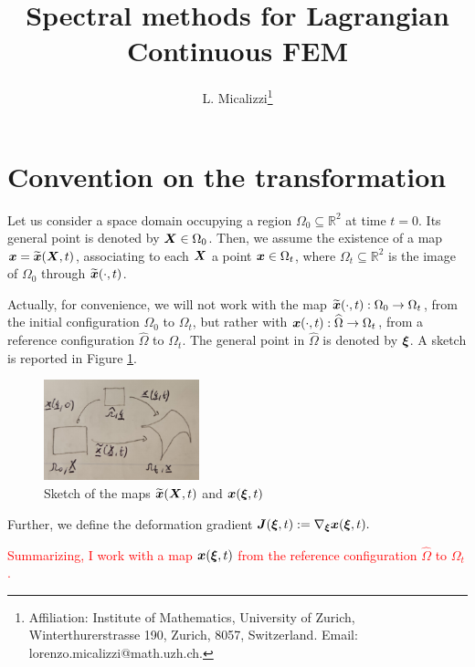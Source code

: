\documentclass[english]{article}
\theoremstyle{thmstyleone}
\theoremstyle{thmstyletwo}
\theoremstyle{thmstylethree}
\newcommand{\uvec}[2][3]{\boldsymbol{#2\mkern-#1mu}\mkern#1mu}
\begin{document}
\author{L. Micalizzi\footnote{Affiliation: Institute of Mathematics, University of Zurich, Winterthurerstrasse 190, Zurich, 8057, Switzerland. Email: lorenzo.micalizzi@math.uzh.ch.} }
\title{Spectral methods for Lagrangian Continuous FEM}  


\maketitle


\section{Convention on the transformation}
Let us consider a space domain occupying a region $\Omega_0\subseteq \mathbb{R}^2$ at time $t=0$. Its general point is denoted by $\uvec{X}\in \Omega_0$.
%
Then, we assume the existence of a map $\uvec{x}=\widetilde{\uvec{x}}(\uvec{X},t)$, associating to each $\uvec{X}$ a point $\uvec{x}\in \Omega_t$, where $\Omega_t\subseteq \mathbb{R}^2$ is the image of $\Omega_0$ through $\widetilde{\uvec{x}}(\cdot,t)$.

Actually, for convenience, we will not work with the map $\widetilde{\uvec{x}}(\cdot,t):\Omega_0\rightarrow\Omega_t$, from the initial configuration $\Omega_0$ to $\Omega_t$, but rather with $\uvec{x}(\cdot,t):\widehat{\Omega}\rightarrow\Omega_t$, from a reference configuration $\widehat{\Omega}$ to $\Omega_t$.
The general point in $\widehat{\Omega}$ is denoted by $\uvec{\xi}$.
%
A sketch is reported in Figure \ref{fig:lagrangian_maps}.
%
\begin{figure}
	\centering
	\includegraphics[width=0.4\textwidth]{lagrangian_maps.pdf}
	\caption{Sketch of the maps $\widetilde{\uvec{x}}(\uvec{X},t)$ and $\uvec{x}(\uvec{\xi},t)$}\label{fig:lagrangian_maps}
\end{figure}
%
Further, we define the deformation gradient $\uvec{J}(\uvec{\xi},t):=\nabla_{\uvec{\xi}}\uvec{x}(\uvec{\xi},t).$



\textcolor{red}{Summarizing, I work with a map $\uvec{x}(\uvec{\xi},t)$ from the reference configuration $\widehat{\Omega}$ to $\Omega_t$.}
\end{document}
